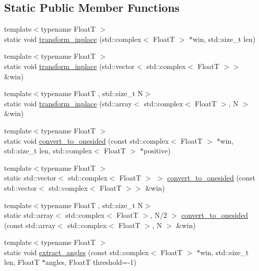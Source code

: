 \subsection*{Static Public Member Functions}
\begin{DoxyCompactItemize}
\item 
{\footnotesize template$<$typename FloatT $>$ }\\static void \hyperlink{structdevfix_1_1dsp_1_1fft_af0c91dff74868f580ad295448e50693f}{transform\+\_\+inplace} (std\+::complex$<$ FloatT $>$ $\ast$win, std\+::size\+\_\+t len)
\item 
{\footnotesize template$<$typename FloatT $>$ }\\static void \hyperlink{structdevfix_1_1dsp_1_1fft_ae3d7d5529ffad8aa929c5353252df7f5}{transform\+\_\+inplace} (std\+::vector$<$ std\+::complex$<$ FloatT $>$$>$ \&win)
\item 
{\footnotesize template$<$typename FloatT , std\+::size\+\_\+t N$>$ }\\static void \hyperlink{structdevfix_1_1dsp_1_1fft_a56cf2ee0f12d0a4c4bdcded3db38e088}{transform\+\_\+inplace} (std\+::array$<$ std\+::complex$<$ FloatT $>$, N $>$ \&win)
\item 
{\footnotesize template$<$typename FloatT $>$ }\\static void \hyperlink{structdevfix_1_1dsp_1_1fft_a6ed95d078d9828e160e6d9911c253b5f}{convert\+\_\+to\+\_\+onesided} (const std\+::complex$<$ FloatT $>$ $\ast$win, std\+::size\+\_\+t len, std\+::complex$<$ FloatT $>$ $\ast$positive)
\item 
{\footnotesize template$<$typename FloatT $>$ }\\static std\+::vector$<$ std\+::complex$<$ FloatT $>$ $>$ \hyperlink{structdevfix_1_1dsp_1_1fft_a595260b93cce8bcec41570a93521b263}{convert\+\_\+to\+\_\+onesided} (const std\+::vector$<$ std\+::complex$<$ FloatT $>$$>$ \&win)
\item 
{\footnotesize template$<$typename FloatT , std\+::size\+\_\+t N$>$ }\\static std\+::array$<$ std\+::complex$<$ FloatT $>$, N/2 $>$ \hyperlink{structdevfix_1_1dsp_1_1fft_a7529cbbcd074fe451c13791acfb77fb0}{convert\+\_\+to\+\_\+onesided} (const std\+::array$<$ std\+::complex$<$ FloatT $>$, N $>$ \&win)
\item 
{\footnotesize template$<$typename FloatT $>$ }\\static void \hyperlink{structdevfix_1_1dsp_1_1fft_ac2be4d53cf6ae645c4be7b773f55e3ca}{extract\+\_\+angles} (const std\+::complex$<$ FloatT $>$ $\ast$win, std\+::size\+\_\+t len, FloatT $\ast$angles, FloatT threshold=-\/1)

\end{DoxyCompactItemize}
